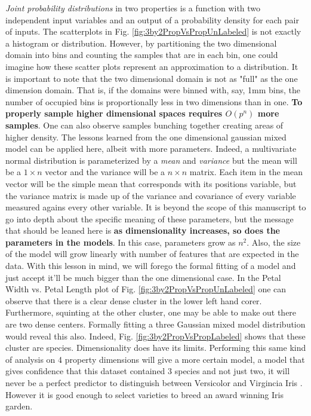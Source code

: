 \emph{Joint probability distributions} in two properties is a function with two independent input variables and an output of a probability density for each pair of inputs. The scatterplots in Fig. \ref{fig:3by2PropVsPropUnLabeled} is not exactly a histogram or distribution. However, by partitioning the two dimensional domain into bins and counting the samples that are in each bin, one could imagine how these scatter plots represent an approximation to a distribution. It is important to note that the two dimensional domain is not as "full" as the one dimension domain. That is, if the domains were binned with, say, 1mm bins, the number of occupied bins is proportionally less in two dimensions than in one. \textbf{To properly sample higher dimensional spaces requires $O(p^n)$ more samples}. One can also observe samples bunching together creating areas of higher density.  The lessons learned from the one dimensional gaussian mixed model can be applied here, albeit with more parameters. Indeed, a multivariate normal distribution is parameterized by a \emph{mean} and \emph{variance} but the mean will be a $1 \times n$ vector and the variance will be a $n \times n$ matrix. Each item in the mean vector will be the simple mean that corresponds with its positions variable, but the variance matrix is made up of the variance and covariance of every variable measured agains every other variable. It is beyond the scope of this manuscript to go into depth about the specific meaning of these parameters, but the message that should be leaned here is \textbf{as dimensionality increases, so does the parameters in the models}. In this case, parameters grow as $n^2$. Also, the size of the model will grow linearly with number of features that are expected in the data. With this lesson in mind, we will forego the formal fitting of a model and just accept it'll be much bigger than the one dimensional case. In the Petal Width vs. Petal Length plot of Fig. \ref{fig:3by2PropVsPropUnLabeled} one can observe that there is a clear dense cluster in the lower left hand corer. Furthermore, squinting at the other cluster, one may be able to make out there are two dense centers. Formally fitting a three Gaussian mixed model distribution would reveal this also. Indeed, Fig. \ref{fig:3by2PropVsPropLabeled} shows that these cluster are species. Dimensionality does have its limits. Performing this same kind of analysis on 4 property dimensions will give a more certain model, a model that gives confidence that this dataset contained 3 species and not just two, it will never be a perfect predictor to distinguish between Versicolor and Virgincia Iris \cite{Iris:Fisher}. However it is good enough to select varieties to breed an award winning Iris garden.

